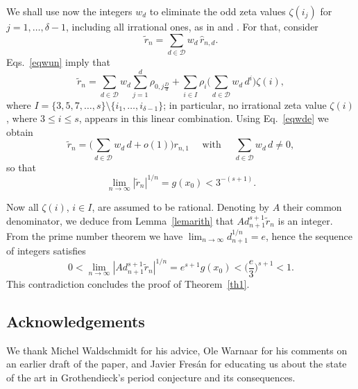 \documentclass{article}
\numberwithin{equation}{section}
\theoremstyle{remark}
\newcommand{\calD}{{\mathcal D}}
\begin{document}
\bigskip

We shall use now the integers $w_d$ to eliminate the odd zeta values $\zeta(i_j)$ for $j=1,\dots,\delta-1$, including all irrational ones, as in \cite{Zudilintrick} and \cite{Sprang}. For that, consider
$$\widetilde r_n = \sum_{d\in\calD} w_d \, \widehat r_{n,d}.$$
Eqs.~\eqref{eqwun} imply that
$$\widetilde r_n = \sum_{d\in\calD} w_d \sum_{j=1}^d \rho_{0,j\frac{D}{d}} +\sum_{i\in I } \rho_i \bigg( \sum_{d\in\calD} w_d \, d^i \bigg) \zeta(i),$$
where $I = \{3,5,7,\ldots,s\}\setminus \{i_1,\ldots,i_{\delta-1}\}$; in particular, no irrational zeta value $\zeta(i)$, where $3\leq i\leq s$, appears in this linear combination. Using Eq.~\eqref{eqwde} we obtain
$$ \widetilde r_n = \bigg( \sum_{d\in\calD}w_d \, d +o(1) \bigg) r_{n,1}  \quad \mbox{ with }   \quad \sum_{d\in\calD}w_d \, d \neq 0, $$
so that
$$\lim_{n\to\infty} | \widetilde r_n | ^{1/n} = g(x_0) <3^{-(s+1)}.$$

Now all $\zeta(i)$, $i\in I$, are assumed to be rational. Denoting by $A$ their common denominator, we deduce from Lemma~\ref{lemarith} that 
$A d_{n+1}^{s+1} \widetilde r_n $ is an integer. From the prime number theorem we have $\lim_{n\to\infty} d_{n+1}^{1/n} = e $, hence the sequence of integers satisfies 
$$0 < \lim_{n\to\infty} | A d_{n+1}^{s+1} \widetilde r_n | ^{1/n} = e^{s+1} g(x_0) < \Big(\frac{e}{3}\Big)^{s+1} < 1.$$ 
This contradiction concludes the proof of Theorem~\ref{th1}. 

\subsection*{Acknowledgements}
\noindent
We thank Michel Waldschmidt for his advice, Ole Warnaar for his comments on an earlier draft of the paper, and
Javier Fres\'an for educating us about the state of the art in Grothendieck's period conjecture and its consequences.

\newcommand{\url}{\texttt} \providecommand{\bysame}{\leavevmode ---\ }
\providecommand{\og}{``}
\providecommand{\fg}{''}
\providecommand{\smfandname}{\&}
\providecommand{\smfedsname}{\'eds.}
\providecommand{\smfedname}{\'ed.}
\providecommand{\smfmastersthesisname}{M\'emoire}
\providecommand{\smfphdthesisname}{Th\`ese}
\end{document}
